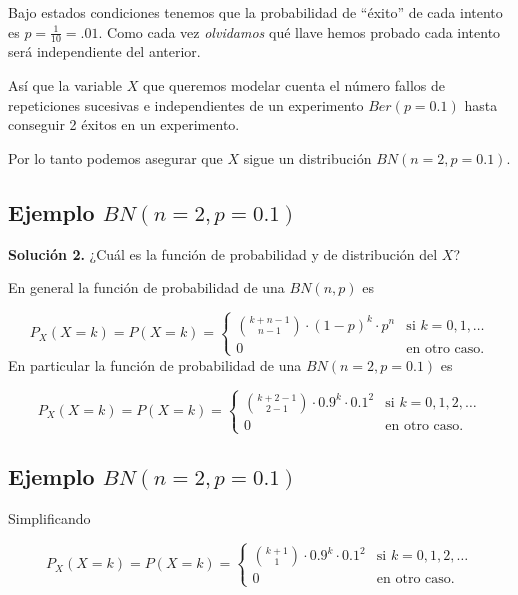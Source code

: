 \documentclass[]{book}
\begin{document}
Bajo estados condiciones tenemos que la probabilidad de ``éxito'' de cada intento es \(p=\frac{1}{10}=.01\). Como cada vez \emph{olvidamos} qué llave hemos probado cada intento será independiente del anterior.

Así que la variable \(X\) que queremos modelar cuenta el número fallos de repeticiones sucesivas e independientes de un experimento \(Ber(p=0.1)\) hasta conseguir 2 éxitos en un experimento.

Por lo tanto podemos asegurar que \(X\) sigue un distribución \(BN(n=2,p=0.1).\)

\hypertarget{ejemplo-bnn2p0.1}{%
\subsection{\texorpdfstring{Ejemplo \(BN(n=2,p=0.1)\)}{Ejemplo BN(n=2,p=0.1)}}\label{ejemplo-bnn2p0.1}}

\textbf{Solución 2.} ¿Cuál es la función de probabilidad y de distribución del \(X\)?

En general la función de probabilidad de una \(BN(n,p)\) es

\[
P_X(X=k)=P(X=k)=
\left\{
\begin{array}{cc} 
{k+n-1\choose n-1} \cdot (1-p)^{k}\cdot p^n & \mbox{si }  k=0,1,\ldots \\ 0 & \mbox{en otro caso.}\end{array}\right.
\]
En particular la función de probabilidad de una \(BN(n=2,p=0.1)\) es

\[
P_X(X=k)=P(X=k)=
\left\{
\begin{array}{cc} 
{k+2-1\choose 2-1} \cdot 0.9^{k}\cdot 0.1^2 & \mbox{si }  k=0,1,2,\ldots \\ 0 & \mbox{en otro caso.}\end{array}\right.
\]

\hypertarget{ejemplo-bnn2p0.1-1}{%
\subsection{\texorpdfstring{Ejemplo \(BN(n=2,p=0.1)\)}{Ejemplo BN(n=2,p=0.1)}}\label{ejemplo-bnn2p0.1-1}}

Simplificando

\[
P_X(X=k)=P(X=k)=
\left\{
\begin{array}{cc} 
{k+1\choose 1} \cdot 0.9^{k}\cdot 0.1^2 & \mbox{si }  k=0,1,2,\ldots \\ 0 & \mbox{en otro caso.}\end{array}\right.
\]
\end{document}

